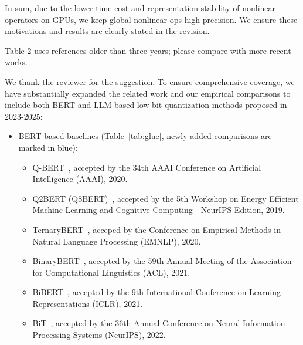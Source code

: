 \begin{revresponse}[]
In sum, due to the lower time cost and representation stability of nonlinear operators on GPUs, we keep global nonlinear ops high-precision. We ensure these motivations and results are clearly stated in the revision. 

\end{revresponse}


\begin{revcomment}
Table 2 uses references older than three years; please compare with more recent works.
\end{revcomment}
\begin{revresponse}[]

We thank the reviewer for the suggestion. To ensure comprehensive coverage, we have substantially expanded the related work and our empirical comparisons to include both BERT and LLM based low-bit quantization methods proposed in 2023-2025:
\begin{itemize}
    \item BERT-based baselines (Table~\ref{tab:glue}, newly added comparisons are marked in blue): 
    \begin{itemize}
        \item Q-BERT~\cite{shen2020qbert}, accepted by the 34th AAAI Conference on Artificial Intelligence (AAAI), 2020.
        \item Q2BERT (Q8BERT)~\cite{zafrir2019q8bert}, accepted by the 5th Workshop on Energy Efficient Machine Learning and Cognitive Computing - NeurIPS Edition, 2019. 
        \item TernaryBERT~\cite{zhang2020ternarybert}, acceped by the Conference on Empirical Methods in Natural Language Processing (EMNLP), 2020. 
        \item BinaryBERT~\cite{bai2021binarybert}, accepted by the 59th Annual Meeting of the Association for Computational Linguistics (ACL), 2021. 
        \item BiBERT~\cite{qin2022bibert}, accepted by the 9th International Conference on Learning Representations (ICLR), 2021. 
        \item BiT~\cite{liu2022bit}, accepted by the 36th Annual Conference on Neural Information Processing Systems (NeurIPS), 2022. 
\end{itemize}
\end{itemize}
\end{revresponse}
